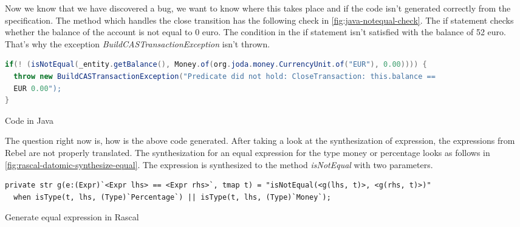 






Now we know that we have discovered a bug, we want to know where this takes
place and if the code isn't generated correctly from the specification. The
method which handles the close transition has the following check in
\autoref{fig:java-notequal-check}. The if statement checks whether the balance
of the account is not equal to 0 euro. The condition in the if statement isn't
satisfied with the balance of 52 euro. That's why the exception
\textit{BuildCASTransactionException} isn't thrown.

\begin{sourcecode}[h!]
\begin{lstlisting}[language=Java]
if(! (isNotEqual(_entity.getBalance(), Money.of(org.joda.money.CurrencyUnit.of("EUR"), 0.00)))) {
  throw new BuildCASTransactionException("Predicate did not hold: CloseTransaction: this.balance ==
  EUR 0.00");
}
\end{lstlisting}
\caption{Code in Java}
\label{fig:java-notequal-check}
\end{sourcecode}

The question right now is, how is the above code generated.
 After taking a look at the synthesization of
expression, the expressions from Rebel are not properly translated. The
synthesization for an equal expression for the type money or percentage looks as
follows in \autoref{fig:rascal-datomic-synthesize-equal}. The expression is
synthesized to the method \textit{isNotEqual} with two parameters.

\begin{sourcecode}[h!]
\begin{lstlisting}[]
private str g(e:(Expr)`<Expr lhs> == <Expr rhs>`, tmap t) = "isNotEqual(<g(lhs, t)>, <g(rhs, t)>)"
  when isType(t, lhs, (Type)`Percentage`) || isType(t, lhs, (Type)`Money`);
\end{lstlisting}
\caption{Generate equal expression in Rascal}
\label{fig:rascal-datomic-synthesize-equal}
\end{sourcecode}

